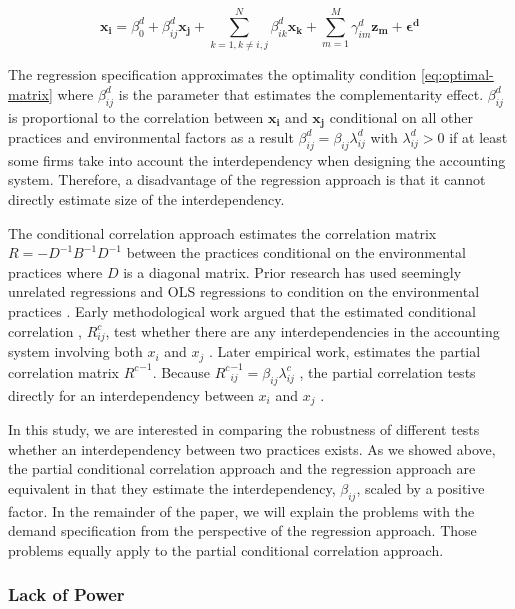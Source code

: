 \documentclass[12pt]{article}
\begin{document}
\begin{equation} \label{eq:demand-specification}
\mathbf{x_i} = \beta_0^d + \beta_{ij}^d \mathbf{x_j} 
		+ \sum_{k = 1, k \neq i,j}^N \beta_{ik}^d \mathbf{x_k} 
        + \sum_{m = 1}^M \gamma_{im}^d \mathbf{z_m}
        + \mathbf{\epsilon^d}
\end{equation}

The regression specification approximates the optimality condition  \eqref{eq:optimal-matrix} where \(\beta^d_{ij}\) is the parameter that estimates the complementarity effect. $\beta_{ij}^d$ is proportional to the  correlation between $\mathbf{x_i}$ and $\mathbf{x_j}$ conditional on all other practices and environmental factors as a result  $\beta^d_{ij} = \beta_{ij} \lambda^d_{ij}$ with $\lambda^d_{ij} > 0$ if at least some firms take into account the interdependency when designing the accounting system. Therefore, a disadvantage of the regression approach is that it cannot directly estimate size of the interdependency.

The conditional correlation approach estimates the correlation matrix $R = -D^{-1}B^{-1}D^{-1}$ between the practices  conditional on the environmental practices where $D$ is a diagonal matrix. Prior research has used seemingly unrelated regressions and OLS regressions to condition on the environmental practices \citep{Indjejikian2012, Matejka2017BalancingEvidence}. Early methodological work argued that the estimated conditional correlation , $R^c_{ij}$, test whether there are any interdependencies in the accounting system involving both $x_i$ and $x_j$ \citep{Arora1996}.  Later empirical work, estimates the partial correlation matrix ${R^c}^{-1}$. Because ${R^c}^{-1}_{ij} = \beta_{ij} \lambda^c_{ij}$ , the partial correlation tests directly for an interdependency between $x_i$ and $x_j$ \citep{Indjejikian2012}. 

In this study, we are interested in comparing the robustness of different tests whether an interdependency between two practices exists. As we showed above, the partial conditional correlation approach and the regression approach are equivalent in that they estimate the interdependency, $\beta_{ij}$, scaled by a positive factor. In the remainder of the paper, we will explain the problems with the demand specification from the perspective of the regression approach. Those problems equally apply to the partial conditional correlation approach.  

\subsubsection{Lack of Power}
\end{document}
